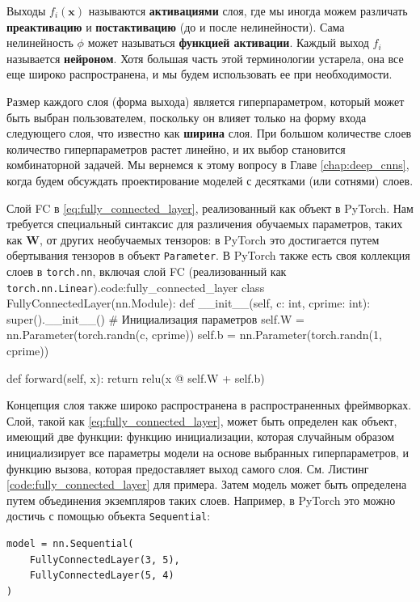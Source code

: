 Выходы $f_i(\mathbf{x})$ называются \textbf{активациями} слоя, где мы иногда можем различать \textbf{преактивацию} и \textbf{постактивацию} (до и после нелинейности). Сама нелинейность $\phi$ может называться \textbf{функцией активации}. Каждый выход $f_i$ называется \textbf{нейроном}. Хотя большая часть этой терминологии устарела, она все еще широко распространена, и мы будем использовать ее при необходимости.

Размер каждого слоя (форма выхода) является гиперпараметром, который может быть выбран пользователем, поскольку он влияет только на форму входа следующего слоя, что известно как \textbf{ширина} слоя. При большом количестве слоев количество гиперпараметров растет линейно, и их выбор становится комбинаторной задачей. Мы вернемся к этому вопросу в Главе \ref{chap:deep_cnns}, когда будем обсуждать проектирование моделей с десятками (или сотнями) слоев.

\begin{mypy}{Слой FC в \eqref{eq:fully_connected_layer}, реализованный как объект в PyTorch. Нам требуется специальный синтаксис для различения обучаемых параметров, таких как $\mathbf{W}$, от других необучаемых тензоров: в PyTorch это достигается путем обертывания тензоров в объект {\footnotesize\texttt{Parameter}}. В PyTorch также есть своя коллекция слоев в {\footnotesize\texttt{torch.nn}}, включая слой FC (реализованный как {\footnotesize\texttt{torch.nn.Linear}}).}{code:fully_connected_layer}
class FullyConnectedLayer(nn.Module):
  def __init__(self, c: int, cprime: int):
    super().__init__()
    # Инициализация параметров
    self.W = nn.Parameter(torch.randn(c, cprime))
    self.b = nn.Parameter(torch.randn(1, cprime))

  def forward(self, x):
    return relu(x @ self.W + self.b)
\end{mypy}

Концепция слоя также широко распространена в распространенных фреймворках. Слой, такой как \eqref{eq:fully_connected_layer}, может быть определен как объект, имеющий две функции: функцию инициализации, которая случайным образом инициализирует все параметры модели на основе выбранных гиперпараметров, и функцию вызова, которая предоставляет выход самого слоя. См. Листинг \ref{code:fully_connected_layer} для примера. Затем модель может быть определена путем объединения экземпляров таких слоев. Например, в PyTorch это можно достичь с помощью объекта {\footnotesize\texttt{Sequential}}:

\vspace{1em}
{\begin{center}\footnotesize
\begin{verbatim}
model = nn.Sequential(
    FullyConnectedLayer(3, 5), 
    FullyConnectedLayer(5, 4)
)
\end{verbatim}
\end{center}}
 
